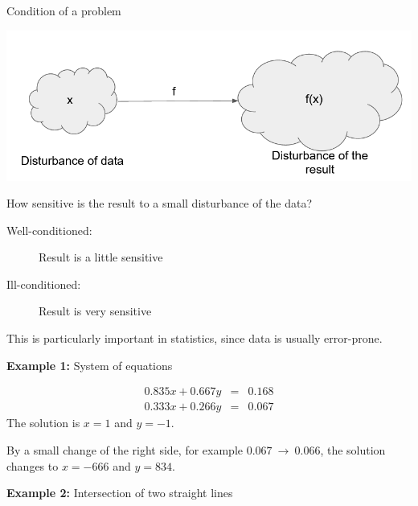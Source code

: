 \documentclass[11pt,compress,t,notes=noshow, xcolor=table]{beamer}
\begin{document}
\begin{vbframe}{Condition of a problem}

\begin{center}
\includegraphics[width = .6\textwidth]{figure_man/condition_eng.PNG}
\end{center}

How sensitive is the result to a small disturbance of the data?

\begin{description}
 \item[Well-conditioned:] Result is a little sensitive
 \item[Ill-conditioned:] Result is very sensitive
\end{description}

This is particularly important in statistics, since data is usually error-prone.

%
%
%

\framebreak

\textbf{Example 1: }System of equations

\begin{eqnarray*}
0.835x + 0.667y &=& 0.168 \\
0.333x + 0.266y &=& 0.067
\end{eqnarray*}
The solution is $x = 1$ and $y = -1$.

\lz

By a small change of the right side, for example $0.067~\to~0.066$, the solution changes to
$x = -666$ and $y = 834$.

\framebreak

\textbf{Example 2: }Intersection of two straight lines

\begin{center}


\end{center}
\end{vbframe}
\end{document}
